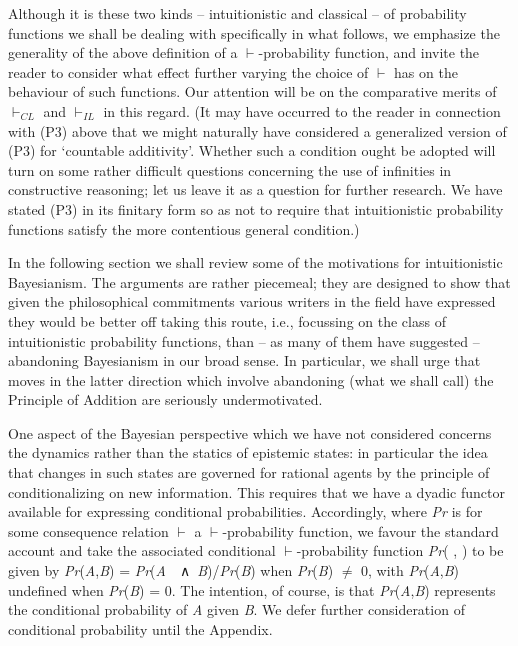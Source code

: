 \documentclass[
  10pt,
  letterpaper,
  DIV=11,
  numbers=noendperiod,
  twoside]{scrartcl}
\begin{document}
Although it is these two kinds -- intuitionistic and classical -- of
probability functions we shall be dealing with specifically in what
follows, we emphasize the generality of the above definition of a
\(\vdash\)-probability function, and invite the reader to consider what
effect further varying the choice of \(\vdash\) has on the behaviour of
such functions. Our attention will be on the comparative merits of
\(\vdash_{CL}\) and \(\vdash_{IL}\) in this regard. (It may have
occurred to the reader in connection with (P3) above that we might
naturally have considered a generalized version of (P3) for `countable
additivity'. Whether such a condition ought be adopted will turn on some
rather difficult questions concerning the use of infinities in
constructive reasoning; let us leave it as a question for further
research. We have stated (P3) in its finitary form so as not to require
that intuitionistic probability functions satisfy the more contentious
general condition.)

In the following section we shall review some of the motivations for
intuitionistic Bayesianism. The arguments are rather piecemeal; they are
designed to show that given the philosophical commitments various
writers in the field have expressed they would be better off taking this
route, i.e., focussing on the class of intuitionistic probability
functions, than -- as many of them have suggested --abandoning
Bayesianism in our broad sense. In particular, we shall urge that moves
in the latter direction which involve abandoning (what we shall call)
the Principle of Addition are seriously undermotivated.

One aspect of the Bayesian perspective which we have not considered
concerns the dynamics rather than the statics of epistemic states: in
particular the idea that changes in such states are governed for
rational agents by the principle of conditionalizing on new information.
This requires that we have a dyadic functor available for expressing
conditional probabilities. Accordingly, where \emph{Pr} is for some
consequence relation \(\vdash\) a \(\vdash\)-probability function, we
favour the standard account and take the associated conditional
\(\vdash\)-probability function \emph{Pr}( , ) to be given by
\emph{Pr}(\emph{A},\emph{B}) =
\emph{Pr}(\emph{A}~~∧~\emph{B})/\emph{Pr}(\emph{B}) when
\emph{Pr}(\emph{B}) \({\neq}\) 0, with \emph{Pr}(\emph{A},\emph{B})
undefined when \emph{Pr}(\emph{B}) = 0. The intention, of course, is
that \emph{Pr}(\emph{A},\emph{B}) represents the conditional probability
of \emph{A} given \emph{B}. We defer further consideration of
conditional probability until the Appendix.
\end{document}
